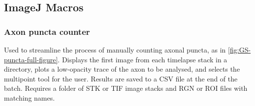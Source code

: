 \documentclass[
  12pt,
  a4paper,
]{book}
\begin{document}
\hypertarget{imagej-macros}{%
\subsection{ImageJ Macros}\label{imagej-macros}}

\hypertarget{axon-puncta-counter}{%
\subsubsection{Axon puncta counter}\label{axon-puncta-counter}}

Used to streamline the process of manually counting axonal puncta, as in \ref{fig:GS-puncta-full-figure}. Displays the first image from each timelapse stack in a directory, plots a low-opacity trace of the axon to be analysed, and selects the multipoint tool for the user. Results are saved to a CSV file at the end of the batch. Requires a folder of STK or TIF image stacks and RGN or ROI files with matching names.
\end{document}
